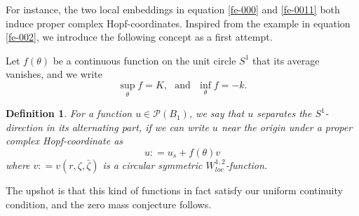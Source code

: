 \documentclass[a4paper,11pt]{amsart}
\numberwithin{equation}{section}
\newtheorem{defn}[theorem]{Definition}
\def\cP{{\mathcal P}}
\def\cP{{\mathcal P}}
\def\z{{\zeta}}
\begin{document}
For instance, the two local embeddings in equation \eqref{fe-000} and \eqref{fe-0011}
both induce proper complex Hopf-coordinates. 
Inspired from the example in equation \eqref{fe-002},
we introduce the following concept as a first attempt.

Let $f(\theta)$ be a continuous function on the unit circle $S^1$ that its average vanishes, 
and we write 
\begin{equation}
\label{fe-003}
\sup_{\theta} f = K,\ \ \ \mbox{and} \ \ \ \inf_{\theta} f= -k. 
\end{equation}
 
\begin{defn}
\label{defn-sf-001}
For a function $u\in \cP(B_1)$,
we say that $u$ separates the $S^1$-direction in its alternating part, 
if we can write $u$ near the origin under 
a proper complex Hopf-coordinate as 
$$ u: = u_s + f(\theta) v$$
where $v: = v(r, \z, \bar\z)$ is a circular symmetric $W^{1,2}_{loc}$-function.
\end{defn}

The upshot is that this kind of functions
in fact satisfy our uniform continuity condition, 
and the zero mass conjecture follows. 
\end{document}
